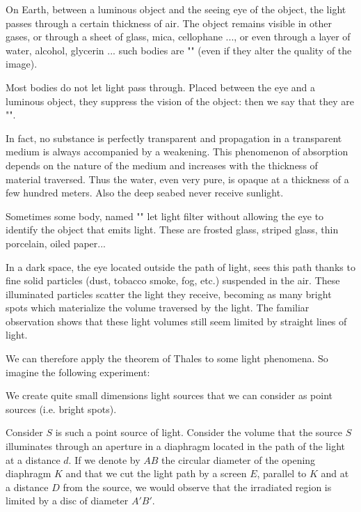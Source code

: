 	On Earth, between a luminous object and the seeing eye of  the object, the light passes through a certain thickness of air. The object remains visible in other gases, or through a sheet of glass, mica, cellophane ..., or even through a layer of water, alcohol, glycerin ... such bodies are "" (even if they alter the quality of the image).
	
	Most bodies do not let light pass through. Placed between the eye and a luminous object, they suppress the vision of the object: then we say that they are "".
	
	In fact, no substance is perfectly transparent and propagation in a transparent medium is always accompanied by a weakening. This phenomenon of absorption depends on the nature of the medium and increases with the thickness of material traversed. Thus the water, even very pure, is opaque at a thickness of a few hundred meters. Also the deep seabed never receive sunlight.
	
	Sometimes some body, named "" let light filter  without allowing the eye to identify the object that emits light. These are frosted glass, striped glass, thin porcelain, oiled paper...
	
	In a dark space, the eye located outside the path of light, sees this path thanks to fine solid particles (dust, tobacco smoke, fog, etc.) suspended in the air. These illuminated particles scatter the light they receive, becoming as many bright spots which materialize the volume traversed by the light. The familiar observation shows that these light volumes still seem limited by straight lines of light.
	
	We can therefore apply the theorem of Thales to some light phenomena. So imagine the following experiment:
	
	We create quite small dimensions light sources that we can consider as point sources (i.e. bright spots).
	
	Consider $S$ is such a point source of light. Consider the volume that the source $S$ illuminates through an aperture in a diaphragm located in the path of the light at a distance $d$. If we denote by $AB$ the circular diameter of the opening diaphragm $K$ and that we cut the light path by a screen $E$, parallel to $K$ and at a distance $D$ from the source, we would observe that the irradiated region is limited by a disc of diameter $A'B'$.
	
